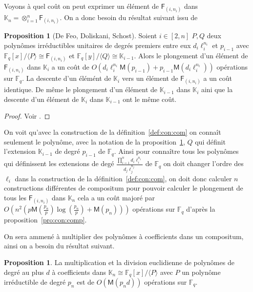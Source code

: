 \documentclass[10pt,a4paper]{book}
\theoremstyle{plain}
\theoremstyle{definition}
\theoremstyle{definition}
\theoremstyle{definition}
\newtheorem{prop}[thm]{Proposition}
\theoremstyle{definition}
\theoremstyle{remark}
\theoremstyle{remark}
\theoremstyle{definition}
\begin{document}
 Voyons à quel coût on peut exprimer un élément de $\mathsf{F}_{(i,n_i)}$ dans 
 $\mathbb{K}_n=\otimes_{i=1}^n\mathsf{F}_{(i,n_i)}$. On a donc 
 besoin du résultat suivant issu de \cite[Theorem 1]{DeFeoDoliskaniSchost14}
 \begin{prop}[De Feo, Doliskani, Schost]
 \label{pro:com:inj}
 Soient $i \in [2,n] $ $P,Q$ deux polynômes irréductibles unitaires de degrés 
 premiers entre eux $d_i\ell_i^{n_i}$ et $p_{i-1}$ avec
   $\mathbb{F}_q[x]/\langle P \rangle \cong \mathsf{F}_{(i,n_i)}$ et 
   $\mathbb{F}_q[y]/\langle Q \rangle \cong \mathbb{K}_{i-1}$. Alors le 
   plongement d'un élément de $\mathsf{F}_{(i,n_i)} $  dans $\mathbb{K}_{i}$ a un
   coût de 
   $O(d_i\ell_i^{n_i}\mathsf{M}(p_{i-1})+p_{i-1}\mathsf{M}(d_i\ell_i^{n_i}))$ 
   opérations sur $\mathbb{F}_q$. La descente d'un élémént de $\mathbb{K}_{i} $
   vers un élément de $\mathsf{F}_{(i,n_i)}$  a un coût identique. 
   De même le plongement d'un élément de $\mathbb{K}_{i-1}$ dans 
   $\mathbb{K}_{i}$ aini que la descente d'un élément de $\mathbb{K}_{i}$ dans 
   $\mathbb{K}_{i-1}$ ont le même coût.
 \end{prop}

 \begin{proof}
 Voir \cite{DeFeoDoliskaniSchost14}.
\end{proof}  

On voit qu'avec la construction de la définition~\ref{def:con:com} on connaît 
seulement le polynôme, avec la notation de la proposition~\ref{pro:com:inj}, $Q$
qui définit l'extension $\mathbb{K}_{i-1}$ de degré $p_{i-1}$ de 
$\mathbb{F}_q$. Ainsi pour connaître tous les polynômes qui définissent les 
extensions de degé $\frac{\prod_{i=1}^{n}d_i\ell_i^{n_i}}{d_j \ell_j^{n_j}}$ de
$\mathbb{F}_q$ on doit changer l'ordre des $\ell_i$ dans la construction de la 
définition~\ref{def:con:com}, on doit donc calculer $n$ constructions 
différentes de compositum pour pouvoir calculer le plongement de tous les 
$\mathsf{F}_{(i,n_i)}$ dans $\mathbb{K}_{n}$ cela a un coût majoré par 
$O(n^2(p\mathsf{M}(\frac{p_n}{p})\log(\frac{p_n}{p})+\mathsf{M}(p_n)))$ 
opérations sur $\mathbb{F}_q$ d'après la proposition~\ref{pro:con:comp}.

 On sera ammené à multiplier des polynômes à coefficients dans un 
 compositum, ainsi on a besoin du résultat suivant.

 \begin{prop}
 \label{pro:mul:com}
 La multiplication et la division euclidienne de polynômes de degré au plus $d$
 à coefficients dans $\mathbb{K}_{n} \cong \mathbb{F}_q[x]/ \langle P \rangle$
 avec $P$ un polynôme irréductible de degré $p_n$ est de $O(\mathsf{M}(p_nd))$ 
 opérations sur $\mathbb{F}_q$.
 \end{prop} 
 
\end{document}
